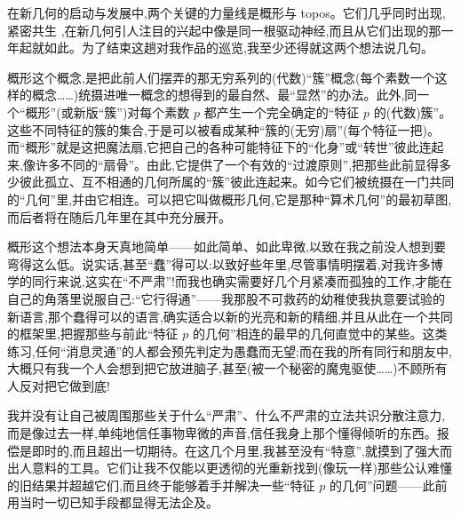 在新几何的启动与发展中,两个关键的力量线是概形与 topos。它们几乎同时出现,紧密共生
,在新几何引人注目的兴起中像是同一根驱动神经,而且从它们出现的那一年起就如此。为了结束这趟对我作品的巡览,我至少还得就这两个想法说几句。

概形这个概念,是把此前人们摆弄的那无穷系列的(代数)“簇”概念(每个素数一个这样的概念……)统摄进唯一概念的想得到的最自然、最“显然”的办法。此外,同一个“概形”(或新版“簇”)对每个素数 $p$ 都产生一个完全确定的“特征 $p$ 的(代数)簇”。这些不同特征的簇的集合,于是可以被看成某种“簇的(无穷)扇”(每个特征一把)。而“概形”就是这把魔法扇,它把自己的各种可能特征下的“化身”或“转世”彼此连起来,像许多不同的“扇骨”。由此,它提供了一个有效的“过渡原则”,把那些此前显得多少彼此孤立、互不相通的几何所属的“簇”彼此连起来。如今它们被统摄在一门共同的“几何”里,并由它相连。可以把它叫做概形几何,它是那种“算术几何”的最初草图,而后者将在随后几年里在其中充分展开。

概形这个想法本身天真地简单——如此简单、如此卑微,以致在我之前没人想到要弯得这么低。说实话,甚至“蠢”得可以:以致好些年里,尽管事情明摆着,对我许多博学的同行来说,这实在“不严肃”!而我也确实需要好几个月紧凑而孤独的工作,才能在自己的角落里说服自己:“它行得通”——我那股不可救药的幼稚使我执意要试验的新语言,那个蠢得可以的语言,确实适合以新的光亮和新的精细,并且从此在一个共同的框架里,把握那些与前此“特征 $p$ 的几何”相连的最早的几何直觉中的某些。这类练习,任何“消息灵通”的人都会预先判定为愚蠢而无望;而在我的所有同行和朋友中,大概只有我一个人会想到把它放进脑子,甚至(被一个秘密的魔鬼驱使……)不顾所有人反对把它做到底!

我并没有让自己被周围那些关于什么“严肃”、什么不严肃的立法共识分散注意力,而是像过去一样,单纯地信任事物卑微的声音,信任我身上那个懂得倾听的东西。报偿是即时的,而且超出一切期待。在这几个月里,我甚至没有“特意”,就摸到了强大而出人意料的工具。它们让我不仅能以更透彻的光重新找到(像玩一样)那些公认难懂的旧结果并超越它们,而且终于能够着手并解决一些“特征 $p$ 的几何”问题——此前用当时一切已知手段都显得无法企及。

